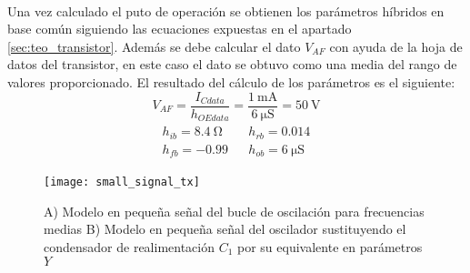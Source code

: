 \paragraph{}
Una vez calculado el puto de operaci\'on se obtienen los par\'ametros h\'ibridos en base com\'un siguiendo las ecuaciones expuestas en el apartado \ref{sec:teo_transistor}. Adem\'as se debe calcular el dato $V_{AF}$ con ayuda de la hoja de datos del transistor, en este caso el dato se obtuvo como una media del rango de valores proporcionado. El resultado del c\'alculo de los par\'ametros es el siguiente:
\begin{equation}
   \label{eq:result_pol1}
V_{AF} = \frac{I_{Cdata}}{h_{OEdata}} =\frac{\SI{1}{\milli\ampere}}{\SI{6}{\micro\siemens}} =  \SI{50}{\volt} 
\end{equation}
\begin{equation}
   \label{eq:result_pol2}
\begin{array}{rl} 
      \begin{array}{l}
	 h_{ib} =  \SI{8.4}{\ohm} \\
	 h_{fb} =  -0.99
      \end{array}
      &
      \begin{array}{l}
	 h_{rb} =  0.014 \\
	 h_{ob} =  \SI{6}{\micro\siemens}
      \end{array}
\end{array}
\end{equation}

\begin{figure}[h]
    \centering
    \texttt{[image: small\_signal\_tx]}
    \caption{A) Modelo en pequeña señal del bucle de oscilación para frecuencias medias B) Modelo en pequeña señal del oscilador sustituyendo el condensador de realimentación $C_1$ por su equivalente en parámetros $Y$}
    \label{fig:ss_tx}
\end{figure}

